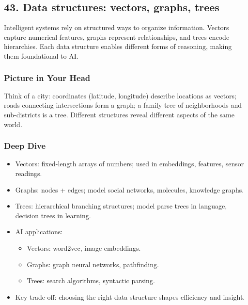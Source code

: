 \documentclass[
  letterpaper,
  DIV=11,
  numbers=noendperiod]{scrreprt}
\providecommand{\tightlist}{%
  \setlength{\itemsep}{0pt}\setlength{\parskip}{0pt}}
\begin{document}
\subsection{43. Data structures: vectors, graphs,
trees}\label{data-structures-vectors-graphs-trees}

Intelligent systems rely on structured ways to organize information.
Vectors capture numerical features, graphs represent relationships, and
trees encode hierarchies. Each data structure enables different forms of
reasoning, making them foundational to AI.

\subsubsection{Picture in Your Head}\label{picture-in-your-head-42}

Think of a city: coordinates (latitude, longitude) describe locations as
vectors; roads connecting intersections form a graph; a family tree of
neighborhoods and sub-districts is a tree. Different structures reveal
different aspects of the same world.

\subsubsection{Deep Dive}\label{deep-dive-42}

\begin{itemize}
\item
  Vectors: fixed-length arrays of numbers; used in embeddings, features,
  sensor readings.
\item
  Graphs: nodes + edges; model social networks, molecules, knowledge
  graphs.
\item
  Trees: hierarchical branching structures; model parse trees in
  language, decision trees in learning.
\item
  AI applications:

  \begin{itemize}
  \tightlist
  \item
    Vectors: word2vec, image embeddings.
  \item
    Graphs: graph neural networks, pathfinding.
  \item
    Trees: search algorithms, syntactic parsing.
  \end{itemize}
\item
  Key trade-off: choosing the right data structure shapes efficiency and
  insight.
\end{itemize}
\end{document}
